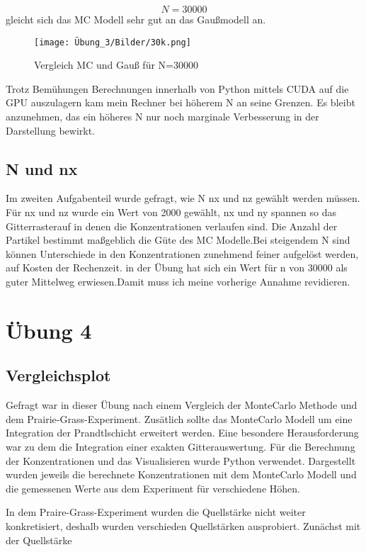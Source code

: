 \documentclass[ngerman]{scrartcl}
\begin{document}
\begin{equation}
    N=30000
\end{equation}
gleicht sich das MC Modell sehr gut an das Gaußmodell an.
\begin{figure}[H]
    \centering
    \texttt{[image: Übung\_3/Bilder/30k.png]}
    \caption{Vergleich MC und Gauß für N=30000}
    \label{fig:my_label}
\end{figure}

Trotz Bemühungen Berechnungen innerhalb von Python mittels CUDA auf die GPU auszulagern kam mein Rechner bei höherem N an seine Grenzen. Es bleibt anzunehmen, das ein höheres N nur noch marginale Verbesserung in der Darstellung bewirkt.
\subsection{N und nx}
Im zweiten Aufgabenteil wurde gefragt, wie N nx und nz gewählt werden müssen. Für nx und nz wurde ein Wert von 2000 gewählt, nx und ny spannen so das Gitterrasterauf in denen die Konzentrationen verlaufen sind. Die Anzahl der Partikel bestimmt maßgeblich die Güte des MC Modelle.Bei steigendem N sind können Unterschiede in den Konzentrationen zunehmend feiner aufgelöst werden, auf Kosten der Rechenzeit. in der Übung hat sich ein Wert für n von 30000 als guter Mittelweg erwiesen.Damit muss ich meine vorherige Annahme revidieren.

\section{Übung 4}
\subsection{Vergleichsplot}
Gefragt war in dieser Übung nach einem Vergleich der MonteCarlo Methode und dem Prairie-Grass-Experiment. Zusätlich sollte das MonteCarlo Modell um eine Integration der Prandtlschicht erweitert werden. Eine besondere Herausforderung war zu dem die Integration einer exakten Gitterauswertung. Für die Berechnung der Konzentrationen und das Visualisieren wurde Python verwendet. Dargestellt wurden jeweils die berechnete Konzentrationen mit dem MonteCarlo Modell und die gemessenen Werte aus dem Experiment für verschiedene Höhen.

In dem Praire-Grass-Experiment wurden die Quellstärke nicht weiter konkretisiert, deshalb wurden verschieden Quellstärken ausprobiert. Zunächst mit der Quellstärke
\end{document}
